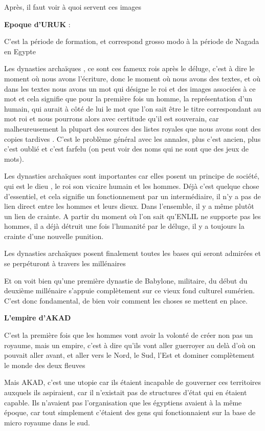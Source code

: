 \documentclass[a4paper,10pt]{article}
\begin{document}
\begin{itemize}
Après, il faut voir à quoi servent ces images

\textbf{Epoque d'URUK} : 

C'est la période de formation, et correspond grosso
modo à la période de Nagada en Egypte

Les dynasties archaïques , ce sont ces fameux rois après le déluge,
c'est à dire le moment où nous avons
l'écriture, donc le moment où nous avons des textes,
et où dans les textes nous avons un mot qui désigne le roi et des
images associées à ce mot et cela signifie que pour la première fois un
homme, la représentation d'un humain, qui aurait à
côté de lui le mot que l'on sait être le titre
correspondant au mot roi et nous  pourrons alors avec certitude
qu'il est souverain, car malheureusement la plupart
des sources des listes royales que nous avons sont des copies tardives
. C'est le problème général avec les annales, plus
c'est ancien, plus c'est oublié et
c'est farfelu (on peut voir des noms qui ne sont que
des jeux de mots).

Les dynasties archaïques sont importantes car elles posent un principe
de société, qui est le dieu , le roi son vicaire humain et les hommes.
Déjà c'est quelque chose d'essentiel,
et cela signifie un fonctionnement par un intermédiaire, il
n'y a pas de lien direct entre les hommes et leurs
dieux.  Dans l'ensemble, il y a même plutôt un lien de
crainte. A partir du moment où  l'on sait
qu'ENLIL ne supporte pas les hommes, il a déjà détruit
une fois l'humanité par le déluge, il y a toujours la
crainte d'une nouvelle punition.

Les dynasties archaïques posent finalement toutes les bases qui seront
admirées et se perpéturont à travers les millénaires

Et on voit bien qu'une première dynastie de Babylone,
militaire, du début du deuxième millénaire s'appuie
complètement sur ce vieux fond culturel sumérien.
C'est donc fondamental, de bien voir comment les
choses se mettent en place.

\textbf{L'empire d'AKAD }

C'est  la première fois que les hommes vont avoir la
volonté de créer non pas un royaume, mais un empire,
c'est à dire qu'ils vont aller
guerroyer au delà d'où on pouvait aller avant, et
aller vers le Nord, le Sud, l'Est et dominer
complètement le  monde des deux fleuves

Mais AKAD, c'est une utopie car ils étaient incapable
de gouverner ces territoires auxquels ils aspiraient, car il
n'existait pas de structures d'état
qui en étaient capable. Ils n'avaient pas
l'organisation que les égyptiens avaient à la même
époque, car tout simplement c'étaient des gens qui
fonctionnaient sur la base de micro royaume dans le sud.


\end{itemize}
\end{document}
